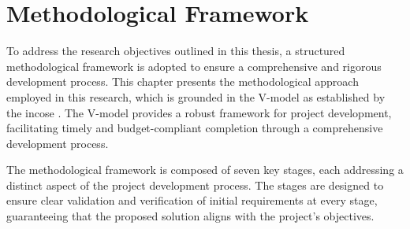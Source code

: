 \chapter{Methodological Framework}\label{ch:methodology_approach}


To address the research objectives outlined in this thesis, a structured methodological framework is adopted to ensure a comprehensive and rigorous development process. This chapter presents the methodological approach employed in this research, which is grounded in the V-model as established by the \gls{incose} \autocite{INCOSE2015}. The V-model provides a robust framework for project development, facilitating timely and budget-compliant completion through a comprehensive development process.

The methodological framework is composed of seven key stages, each addressing a distinct aspect of the project development process. The stages are designed to ensure clear validation and verification of initial requirements at every stage, guaranteeing that the proposed solution aligns with the project's objectives.

